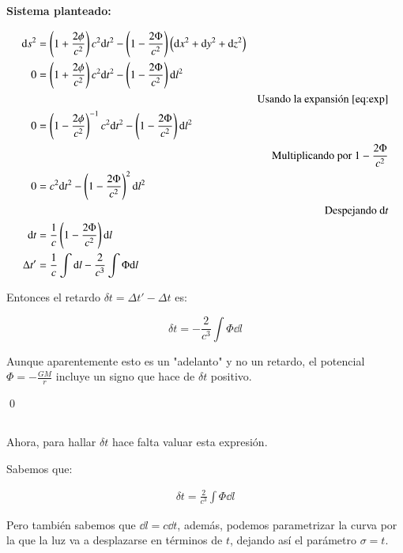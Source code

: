 \bigskip

\textbf{Sistema planteado:}

\begin{align*}
    \dd s^2 &= \left(1+\frac{2\phi}{c^2}\right)c^2\dd t^2 - \left(1-\frac{2\Phi}{c^2}\right)\left(\dd x^2+\dd y^2+ \dd z^2\right)\\
    0 &= \left(1+\frac{2\phi}{c^2}\right)c^2\dd t^2 - \left(1-\frac{2\Phi}{c^2}\right)\dd l^2\\
    &&\text{Usando la expansión \ref{eq:exp}}\\
    0 &= \left(1-\frac{2\phi}{c^2}\right)^{-1}c^2\dd t^2 - \left(1-\frac{2\Phi}{c^2}\right)\dd l^2\\
    &&\text{Multiplicando por }1-\frac{2\Phi}{c^2}\\
    0 &=c^2\dd t^2 - \left(1-\frac{2\Phi}{c^2}\right)^2\dd l^2\\
    &&\text{Despejando }\dd t\\
    \dd t &=\frac{1}{c} \left(1 - \frac{2\Phi}{c^2}\right)\dd l\\
    \Delta t' &= \frac{1}{c}\int \dd l - \frac{2}{c^3}\int \Phi \dd l
\end{align*}

Entonces el retardo $\delta t = \Delta t' - \Delta t$ es:

\begin{equation*}
    \delta t = -\frac{2}{c^3}\int \Phi \dd l
\end{equation*}

Aunque aparentemente esto es un "adelanto" y no un retardo, el potencial $\Phi = -\frac{GM}{r}$ incluye un signo que hace de $\delta t$ positivo.

\qed

\subsection{}

Ahora, para hallar $\delta t$ hace falta valuar esta expresión.

Sabemos que:

\begin{align*}
    \delta t = \frac{2}{c^3}\int \Phi\dd l
\end{align*}

Pero también sabemos que $\dd l = c \dd t$, además, podemos parametrizar la curva por la que la luz va a desplazarse en términos de $t$, dejando así el parámetro $\sigma = t$.


